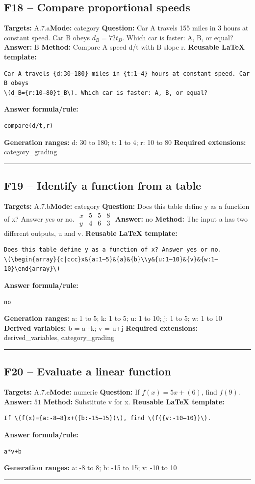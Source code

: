 \documentclass[11pt]{article}
\begin{document}
\subsection{F18 -- Compare proportional speeds}
\textbf{Targets:} A.7.a\quad\textbf{Mode:} category
\textbf{Question:} Car A travels 155 miles in 3 hours at constant speed. Car B obeys \(d_B=72t_B\). Which car is faster: A, B, or equal?
\textbf{Answer:} \(\text{B}\)
\textbf{Method:} Compare A speed d/t with B slope r.
\textbf{Reusable LaTeX template:}
\begin{verbatim}
Car A travels {d:30–180} miles in {t:1–4} hours at constant speed. Car B obeys
\(d_B={r:10–80}t_B\). Which car is faster: A, B, or equal?
\end{verbatim}
\textbf{Answer formula/rule:}
\begin{verbatim}
compare(d/t,r)
\end{verbatim}
\textbf{Generation ranges:} d: 30 to 180; t: 1 to 4; r: 10 to 80
\textbf{Required extensions:} category\_grading
\medskip\hrule\medskip
\subsection{F19 -- Identify a function from a table}
\textbf{Targets:} A.7.b\quad\textbf{Mode:} category
\textbf{Question:} Does this table define y as a function of x? Answer yes or no. \(\begin{array}{c|ccc}x&5&5&8\\y&4&6&3\end{array}\)
\textbf{Answer:} \(\text{no}\)
\textbf{Method:} The input a has two different outputs, u and v.
\textbf{Reusable LaTeX template:}
\begin{verbatim}
Does this table define y as a function of x? Answer yes or no.
\(\begin{array}{c|ccc}x&{a:1–5}&{a}&{b}\\y&{u:1–10}&{v}&{w:1–10}\end{array}\)
\end{verbatim}
\textbf{Answer formula/rule:}
\begin{verbatim}
no
\end{verbatim}
\textbf{Generation ranges:} a: 1 to 5; k: 1 to 5; u: 1 to 10; j: 1 to 5; w: 1 to 10
\textbf{Derived variables:} b = a+k; v = u+j
\textbf{Required extensions:} derived\_variables, category\_grading
\medskip\hrule\medskip
\subsection{F20 -- Evaluate a linear function}
\textbf{Targets:} A.7.c\quad\textbf{Mode:} numeric
\textbf{Question:} If \(f(x)=5x+(6)\), find \(f(9)\).
\textbf{Answer:} \(51\)
\textbf{Method:} Substitute v for x.
\textbf{Reusable LaTeX template:}
\begin{verbatim}
If \(f(x)={a:-8–8}x+({b:-15–15})\), find \(f({v:-10–10})\).
\end{verbatim}
\textbf{Answer formula/rule:}
\begin{verbatim}
a*v+b
\end{verbatim}
\textbf{Generation ranges:} a: -8 to 8; b: -15 to 15; v: -10 to 10
\medskip\hrule\medskip
\end{document}

